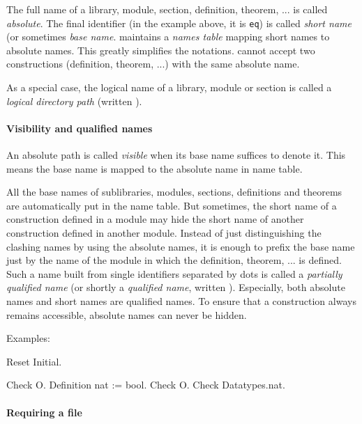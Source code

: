 {\begin{coq_example}
The full name of a library, module, section, definition, theorem,
... is called {\it absolute}. 
The final identifier (in the example
above, it is {\tt eq}) is called {\it short name} (or sometimes {\it
base name}.  {\Coq} maintains a {\it names table} mapping short names
to absolute names. This greatly simplifies the notations.  {\Coq}
cannot accept two constructions (definition, theorem, ...) with the
same absolute name.

As a special case, the logical name of a library, module or section is
called a {\em logical directory path} (written {\dirpath}).

\paragraph{Visibility and qualified names}
An absolute path is called {\it visible} when its base name suffices
to denote it. This means the base name is mapped to the absolute name
in {\Coq} name table.

All the base names of sublibraries, modules, sections, definitions and
theorems are automatically put in the {\Coq} name table. But sometimes,
the short name of a construction defined in a module may hide the short name of another construction defined in another module.
Instead of just distinguishing the clashing names by using the
absolute names, it is enough to prefix the base name just by the name
of the module in which the definition, theorem, ... is defined.
Such a name built from single identifiers separated by dots is called
a {\em partially qualified name} (or shortly a {\em qualified name},
written {\qualid}). Especially, both absolute names and short names
are qualified names. To ensure that a construction always remains
accessible, absolute names can never be hidden.

Examples:

\begin{coq_eval}
Reset Initial.
\end{coq_eval}

\begin{coq_example}
Check O.
Definition nat := bool.
Check O.
Check Datatypes.nat.
\end{coq_example}

\paragraph{Requiring a file}


\end{coq_example}}

